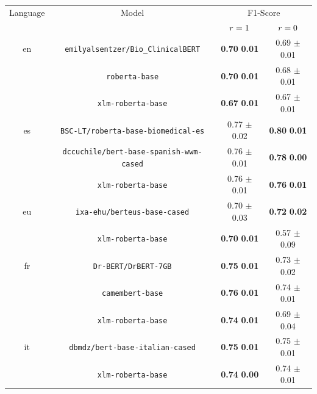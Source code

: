 \begin{tabular}{@{}cccc@{}}%
\toprule%
Language&Model&\multicolumn{2}{c}{F1-Score}\\%
&&$r=1$&$r=0$\\%
\midrule%
en&\verb|emilyalsentzer/Bio_ClinicalBERT|&\textbf{0.70} \bm{$\pm$} \textbf{0.01}&0.69  $\pm$ 0.01\\%
&\verb|roberta-base|&\textbf{0.70} \bm{$\pm$} \textbf{0.01}&0.68  $\pm$ 0.01\\%
&\verb|xlm-roberta-base|&\textbf{0.67} \bm{$\pm$} \textbf{0.01}&0.67  $\pm$ 0.01\\%
\midrule%
es&\verb|BSC-LT/roberta-base-biomedical-es|&0.77  $\pm$ 0.02&\textbf{0.80} \bm{$\pm$} \textbf{0.01}\\%
&\verb|dccuchile/bert-base-spanish-wwm-cased|&0.76  $\pm$ 0.01&\textbf{0.78} \bm{$\pm$} \textbf{0.00}\\%
&\verb|xlm-roberta-base|&0.76  $\pm$ 0.01&\textbf{0.76} \bm{$\pm$} \textbf{0.01}\\%
\midrule%
eu&\verb|ixa-ehu/berteus-base-cased|&0.70  $\pm$ 0.03&\textbf{0.72} \bm{$\pm$} \textbf{0.02}\\%
&\verb|xlm-roberta-base|&\textbf{0.70} \bm{$\pm$} \textbf{0.01}&0.57  $\pm$ 0.09\\%
\midrule%
fr&\verb|Dr-BERT/DrBERT-7GB|&\textbf{0.75} \bm{$\pm$} \textbf{0.01}&0.73  $\pm$ 0.02\\%
&\verb|camembert-base|&\textbf{0.76} \bm{$\pm$} \textbf{0.01}&0.74  $\pm$ 0.01\\%
&\verb|xlm-roberta-base|&\textbf{0.74} \bm{$\pm$} \textbf{0.01}&0.69  $\pm$ 0.04\\%
\midrule%
it&\verb|dbmdz/bert-base-italian-cased|&\textbf{0.75} \bm{$\pm$} \textbf{0.01}&0.75  $\pm$ 0.01\\%
&\verb|xlm-roberta-base|&\textbf{0.74} \bm{$\pm$} \textbf{0.00}&0.74  $\pm$ 0.01\\\bottomrule%
%
\end{tabular}